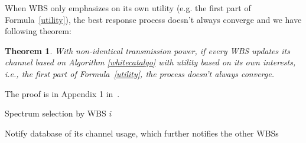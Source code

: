 \documentclass[times]{ettauth}
\newcommand{\ie}{i.e., }
\theoremstyle{mytheoremstyle}
\newtheorem{theorem}{Theorem}[section]
\theoremstyle{mytheoremstyle}
\theoremstyle{mytheoremstyle}
\begin{document}
When WBS only emphasizes on its own utility (e.g. the first part of Formula~\ref{utility}), the best response process doesn't always converge and we have following theorem:
\begin{theorem}
\label{noconvergence}
\emph{With non-identical transmission power, if every WBS updates its channel based on Algorithm \ref{whitecatalgo} with utility based on its own interests, \ie the first part of Formula~\ref{utility}, the process doesn't always converge.}
\end{theorem}
The proof is in Appendix 1 in~\cite{Li2012DistributedTS}.


\begin{algorithm}[h]
\caption{Spectrum selection by WBS $i$}          %
\label{whitecatalgo} 
\DontPrintSemicolon
\SetAlgoLined
{}

	
Notify database of its channel usage, which further notifies the other WBSs

\end{algorithm}


\end{document}
